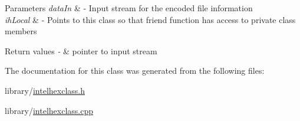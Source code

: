 \begin{DoxyParams}{Parameters}
{\em data\-In} & -\/ Input stream for the encoded file information \\
\hline
{\em ih\-Local} & -\/ Points to this class so that friend function has access to private class members\\
\hline
\end{DoxyParams}

\begin{DoxyRetVals}{Return values}
{\em -\/} & pointer to input stream \\
\hline
\end{DoxyRetVals}


The documentation for this class was generated from the following files\-:\begin{DoxyCompactItemize}
\item 
library/\hyperlink{intelhexclass_8h}{intelhexclass.\-h}\item 
library/\hyperlink{intelhexclass_8cpp}{intelhexclass.\-cpp}\end{DoxyCompactItemize}
